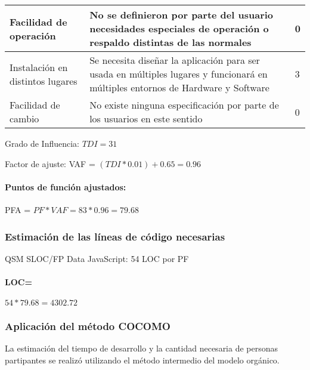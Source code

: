 \begin{table}[H]
    \centering
     \begin{tabular}{|p{5cm}|p{10cm}|l|}
         \hline
        Facilidad de operación & No se definieron por parte del usuario necesidades especiales de operación o respaldo distintas de las normales & 0 \\ \hline
        Instalación en distintos lugares & Se necesita diseñar la aplicación para ser usada en múltiples lugares y funcionará  en múltiples entornos de  Hardware y Software & 3 \\ \hline
        Facilidad de cambio & No existe ninguna especificación por parte de los usuarios en este sentido & 0 \\ \hline
    \end{tabular}
\end{table}

Grado de Influencia: $TDI = 31$

Factor de ajuste: VAF = $ (TDI*0.01) + 0.65 = 0.96$


\paragraph{Puntos de función ajustados:} 

PFA = $PF * VAF = 83 * 0.96 = 79.68$

\subsubsection{Estimación de las líneas de código necesarias}

QSM SLOC/FP Data JavaScript: 54 LOC por PF


\paragraph{LOC=} $54*79.68 = 4302.72$
        
\subsubsection{Aplicación del método COCOMO}

    La estimación del tiempo de desarrollo y la cantidad necesaria de personas partipantes se realizó utilizando el método intermedio del modelo orgánico.

